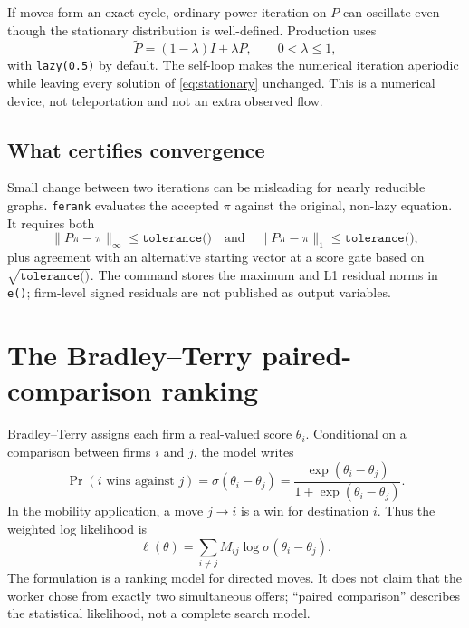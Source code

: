 \documentclass[11pt]{article}
\begin{document}
If moves form an exact cycle, ordinary power iteration on $P$ can oscillate
even though the stationary distribution is well-defined. Production uses
\begin{equation}
  \widetilde P=(1-\lambda)I+\lambda P,
  \qquad 0<\lambda\leq 1,
  \label{eq:lazy}
\end{equation}
with \texttt{lazy(0.5)} by default. The self-loop makes the numerical iteration
aperiodic while leaving every solution of \cref{eq:stationary} unchanged. This
is a numerical device, not teleportation and not an extra observed flow.

\subsection{What certifies convergence}

Small change between two iterations can be misleading for nearly reducible
graphs. \texttt{ferank} evaluates the accepted $\pi$ against the original,
non-lazy equation. It requires both
\begin{equation}
  \lVert P\pi-\pi\rVert_{\infty}\leq\texttt{tolerance()}
  \quad\text{and}\quad
  \lVert P\pi-\pi\rVert_{1}\leq\texttt{tolerance()},
\end{equation}
plus agreement with an alternative starting vector at a score gate based on
$\sqrt{\texttt{tolerance()}}$. The command stores the maximum and L1
residual norms in \texttt{e()}; firm-level signed residuals are not published
as output variables.

\section{The Bradley--Terry paired-comparison ranking}
\label{sec:bt}

Bradley--Terry assigns each firm a real-valued score $\theta_i$. Conditional on
a comparison between firms $i$ and $j$, the model writes
\begin{equation}
  \Pr(i\text{ wins against }j)
  =\sigma(\theta_i-\theta_j)
  =\frac{\exp(\theta_i-\theta_j)}{1+\exp(\theta_i-\theta_j)}.
  \label{eq:btprob}
\end{equation}
In the mobility application, a move $j\rightarrow i$ is a win for destination
$i$. Thus the weighted log likelihood is
\begin{equation}
  \ell(\theta)=\sum_{i\neq j}M_{ij}
  \log\sigma(\theta_i-\theta_j).
  \label{eq:btll}
\end{equation}
The formulation is a ranking model for directed moves. It does not claim that
the worker chose from exactly two simultaneous offers; ``paired comparison''
describes the statistical likelihood, not a complete search model.
\end{document}
